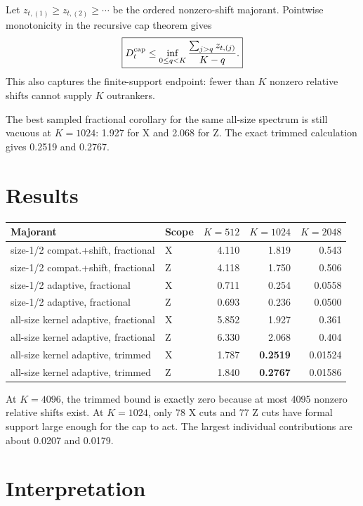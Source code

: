 \documentclass[11pt]{article}
\newcommand{\1}{\mathbf 1}
\begin{document}
Let \(z_{t,(1)}\ge z_{t,(2)}\ge\cdots\) be the ordered nonzero-shift
majorant.  Pointwise monotonicity in the recursive cap theorem gives
\[
 \boxed{
 D_t^{\rm cap}\le
 \inf_{0\le q<K}
 \frac{\sum_{j>q}z_{t,(j)}}{K-q}.}
\]
This also captures the finite-support endpoint: fewer than \(K\) nonzero
relative shifts cannot supply \(K\) outrankers.

The best sampled fractional corollary for the same all-size spectrum is
still vacuous at \(K=1024\): 1.927 for X and 2.068 for Z.  The exact trimmed
calculation gives 0.2519 and 0.2767.

\section{Results}

\begin{center}
\small
\begin{tabular}{llrrr}
\toprule
Majorant & Scope & \(K=512\) & \(K=1024\) & \(K=2048\)\\
\midrule
size-1/2 compat.+shift, fractional & X & 4.110 & 1.819 & 0.543\\
size-1/2 compat.+shift, fractional & Z & 4.118 & 1.750 & 0.506\\
size-1/2 adaptive, fractional & X & 0.711 & 0.254 & 0.0558\\
size-1/2 adaptive, fractional & Z & 0.693 & 0.236 & 0.0500\\
all-size kernel adaptive, fractional & X & 5.852 & 1.927 & 0.361\\
all-size kernel adaptive, fractional & Z & 6.330 & 2.068 & 0.404\\
all-size kernel adaptive, trimmed & X & 1.787 & \textbf{0.2519} & 0.01524\\
all-size kernel adaptive, trimmed & Z & 1.840 & \textbf{0.2767} & 0.01586\\
\bottomrule
\end{tabular}
\end{center}

At \(K=4096\), the trimmed bound is exactly zero because at most 4095
nonzero relative shifts exist.  At \(K=1024\), only 78 X cuts and 77 Z cuts
have formal support large enough for the cap to act.  The largest individual
contributions are about 0.0207 and 0.0179.

\section{Interpretation}
\end{document}
